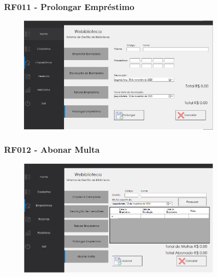 \documentclass{beamer}
\begin{document}
\begin{frame}

\frametitle{RF011 - Prolongar Empréstimo}
\begin{figure}[!ht]
\centering
\includegraphics[width=10cm]{codigo/img3.png}
\end{figure}

\end{frame}
\begin{frame}

\frametitle{RF012 - Abonar Multa}
\begin{figure}[!ht]
\centering
\includegraphics[width=10cm]{codigo/img4.png}
\end{figure}

\end{frame}
\end{document}
